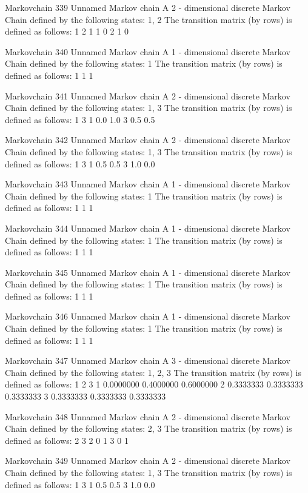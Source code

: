 \documentclass[
  nojss]{jss}
\begin{document}
\begin{CodeChunk}
\begin{CodeOutput}
Markovchain  339 
Unnamed Markov chain 
 A  2 - dimensional discrete Markov Chain defined by the following states: 
 1, 2 
 The transition matrix  (by rows)  is defined as follows: 
  1 2
1 1 0
2 1 0

Markovchain  340 
Unnamed Markov chain 
 A  1 - dimensional discrete Markov Chain defined by the following states: 
 1 
 The transition matrix  (by rows)  is defined as follows: 
  1
1 1

Markovchain  341 
Unnamed Markov chain 
 A  2 - dimensional discrete Markov Chain defined by the following states: 
 1, 3 
 The transition matrix  (by rows)  is defined as follows: 
    1   3
1 0.0 1.0
3 0.5 0.5

Markovchain  342 
Unnamed Markov chain 
 A  2 - dimensional discrete Markov Chain defined by the following states: 
 1, 3 
 The transition matrix  (by rows)  is defined as follows: 
    1   3
1 0.5 0.5
3 1.0 0.0

Markovchain  343 
Unnamed Markov chain 
 A  1 - dimensional discrete Markov Chain defined by the following states: 
 1 
 The transition matrix  (by rows)  is defined as follows: 
  1
1 1

Markovchain  344 
Unnamed Markov chain 
 A  1 - dimensional discrete Markov Chain defined by the following states: 
 1 
 The transition matrix  (by rows)  is defined as follows: 
  1
1 1

Markovchain  345 
Unnamed Markov chain 
 A  1 - dimensional discrete Markov Chain defined by the following states: 
 1 
 The transition matrix  (by rows)  is defined as follows: 
  1
1 1

Markovchain  346 
Unnamed Markov chain 
 A  1 - dimensional discrete Markov Chain defined by the following states: 
 1 
 The transition matrix  (by rows)  is defined as follows: 
  1
1 1

Markovchain  347 
Unnamed Markov chain 
 A  3 - dimensional discrete Markov Chain defined by the following states: 
 1, 2, 3 
 The transition matrix  (by rows)  is defined as follows: 
          1         2         3
1 0.0000000 0.4000000 0.6000000
2 0.3333333 0.3333333 0.3333333
3 0.3333333 0.3333333 0.3333333

Markovchain  348 
Unnamed Markov chain 
 A  2 - dimensional discrete Markov Chain defined by the following states: 
 2, 3 
 The transition matrix  (by rows)  is defined as follows: 
  2 3
2 0 1
3 0 1

Markovchain  349 
Unnamed Markov chain 
 A  2 - dimensional discrete Markov Chain defined by the following states: 
 1, 3 
 The transition matrix  (by rows)  is defined as follows: 
    1   3
1 0.5 0.5
3 1.0 0.0


\end{CodeOutput}
\end{CodeChunk}
\end{document}
